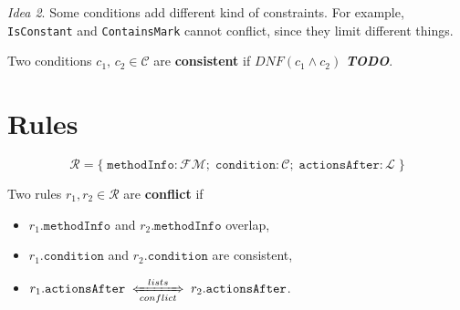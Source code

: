 \documentclass{article}
\newcommand{\cLists}{\xLeftrightarrow[conflict]{lists}}
\begin{document}
\noindent \textit{Idea 2}. Some conditions add different kind of constraints. For example, \texttt{IsConstant} and \texttt{ContainsMark} cannot conflict, since they limit different things.

Two conditions $c_1,\, c_2 \in \mathcal{C}$ are \textbf{consistent} if $DNF(c_1 \land c_2)$ \textbf{\textit{TODO}}.

\section{Rules}
\[
\mathcal{R} = \{\; \texttt{methodInfo} : \mathcal{FM};\; \texttt{condition} : \mathcal{C};\; \texttt{actionsAfter} : \mathcal{L}\;\}
\]

\noindent Two rules $r_1, r_2 \in \mathcal{R}$ are \textbf{conflict} if
\begin{itemize}
    \item $r_1.\texttt{methodInfo}$ and $r_2.\texttt{methodInfo}$ overlap,
    \item $r_1.\texttt{condition}$ and $r_2.\texttt{condition}$ are consistent,
    \item $r_1.\texttt{actionsAfter} \;\cLists\; r_2.\texttt{actionsAfter}$.
\end{itemize}
\end{document}
